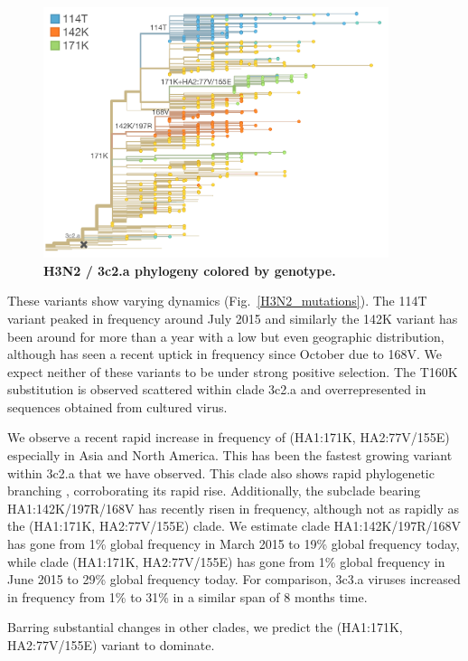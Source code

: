 \documentclass[11pt,oneside,letterpaper]{article}
\begin{document}
\begin{figure}[h!]
	\centering		
	\includegraphics[width=0.9\textwidth]{../figures/feb-2016/H3N2_3c2a_tree.png}
	\caption{\textbf{H3N2 / 3c2.a phylogeny colored by genotype.} 
	}
	\label{H3N2_3c2a_tree}
\end{figure}

These variants show varying dynamics (Fig.\ \ref{H3N2_mutations}). The 114T variant peaked in frequency around July 2015 and similarly the 142K variant has been around for more than a year with a low but even geographic distribution, although has seen a recent uptick in frequency since October due to 168V. We expect neither of these variants to be under strong positive selection. The T160K substitution is observed scattered within clade 3c2.a and overrepresented in sequences obtained from cultured virus.

We observe a recent rapid increase in frequency of (HA1:171K, HA2:77V/155E) especially in Asia and North America. This has been the fastest growing variant within 3c2.a that we have observed. This clade also shows rapid phylogenetic branching \cite{neher2014predicting}, corroborating its rapid rise. Additionally, the subclade bearing HA1:142K/197R/168V has recently risen in frequency, although not as rapidly as the (HA1:171K, HA2:77V/155E) clade. We estimate clade HA1:142K/197R/168V has gone from 1\% global frequency in March 2015 to 19\% global frequency today, while clade (HA1:171K, HA2:77V/155E) has gone from 1\% global frequency in June 2015 to 29\% global frequency today. For comparison, 3c3.a viruses increased in frequency from 1\% to 31\% in a similar span of 8 months time.

Barring substantial changes in other clades, we predict the (HA1:171K, HA2:77V/155E) variant to dominate.
\end{document}
